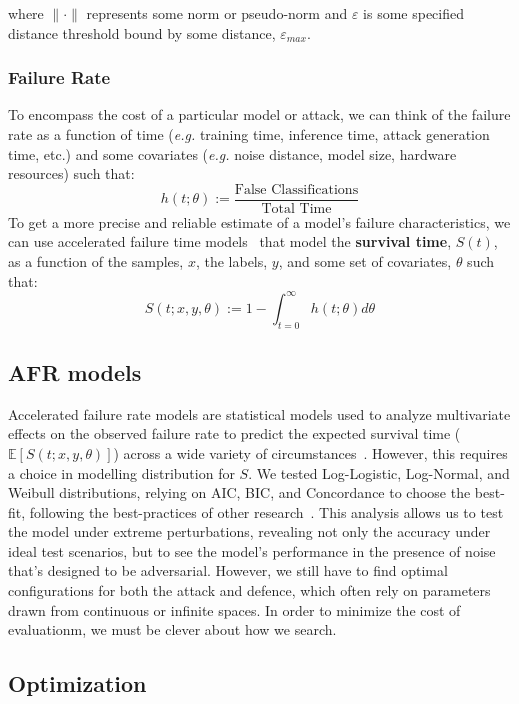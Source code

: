 \documentclass[conference]{IEEEtran}
\begin{document}
where $\| \cdot \|$ represents some norm or pseudo-norm and $\varepsilon$ is some specified distance threshold bound by some distance, $\varepsilon_{max}$.


\subsubsection{Failure Rate}
 To encompass the cost of a particular model or attack, we can think of the failure rate as a function of time (\textit{e.g.} training time, inference time, attack generation time, etc.) and some covariates (\textit{e.g.} noise distance, model size, hardware resources) such that:
\[
h(t; \theta) :=  \frac{\textrm{False~Classifications}}{\textrm{Total~Time}}
\]
To get a more precise and reliable estimate of a model's failure characteristics, we can use accelerated failure time models~\cite{meyers_aft} that model the \textbf{survival time}, $S(t)$, as a function of the samples, $x$, the labels, $y$, and some set of covariates, $\theta$ such that:
\[
S(t; x,y, \theta) := 1 - \int_{t=0}^{\infty} h(t;\theta) d \theta
\]

\subsection{AFR models}
\label{afr}
Accelerated failure rate models are statistical models used to analyze multivariate effects on the observed failure rate to predict the expected survival time ($\mathbb{E}[S(t; x,y, \theta)]$) across a wide variety of circumstances~\cite{aft_models,meyers_aft}. However, this requires a choice in modelling distribution for $S$. We tested Log-Logistic, Log-Normal, and Weibull distributions, relying on AIC, BIC, and Concordance to choose the best-fit, following the best-practices of other research~\cite{aft_models,meyers_aft}.  This analysis allows us to test the model under extreme perturbations, revealing not only the accuracy under ideal test scenarios, but to see the model's performance in the presence of noise that's designed to be adversarial. However, we still have to find optimal configurations for both the attack and defence, which often rely on parameters drawn from continuous or infinite spaces. In order to minimize the cost of evaluationm, we must be clever about how we search.

\subsection{Optimization}
\end{document}
